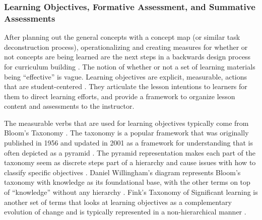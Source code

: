 \documentclass[010-intro.tex]{subfiles}
\begin{document}
    \subsubsection{Learning Objectives, Formative Assessment, and Summative Assessments}

        After planning out the general concepts with a concept map (or similar task deconstruction process),
        operationalizing and creating measures for whether or not concepts are being learned are the next
        steps in a backwards design process for curriculum building
        \cite{wilson2019teaching}.
        The notion of whether or not a set of learning materials being ``effective'' is vague.
        Learning objectives are explicit, measurable, actions that are student-centered
        \cite{ambrose2010learning}.
        They articulate the lesson intentions to learners for them to direct learning efforts,
        and provide a framework to organize lesson content and assessments to the instructor.

        The measurable verbs that are used for learning objectives typically come from Bloom's Taxonomy
        \cite{ambrose2010learning, wilson2019teaching, anderson2001taxonomy}.
        The taxonomy is a popular framework that was originally published in 1956 and updated in 2001
        as a framework for understanding that is often depicted as a pyramid
        \cite{bloomTaxonomyEducationalObjectives1956, anderson2001taxonomy, dunloskyImprovingStudentsLearning2013}.
        The pyramid representation makes each part of the taxonomy seem as discrete steps part of a hierarchy
        and cause issues with how to classify specific objectives
        \cite{masapanta-carrionSystematicReviewUse2018}.
        Daniel Willingham's diagram represents Bloom's taxonomy with knowledge as its foundational base,
        with the other terms on top of ``knowledge'' without any hierarchy
        \cite{DonaldClarkPlan2020, dunloskyImprovingStudentsLearning2013}.
        Fink's Taxonomy of Significant learning is another set of terms that looks at learning objectives as a complementary
        evolution of change and is typically represented in a non-hierarchical manner
        \cite{finkCreatingSignificantLearning2013}.
\end{document}
